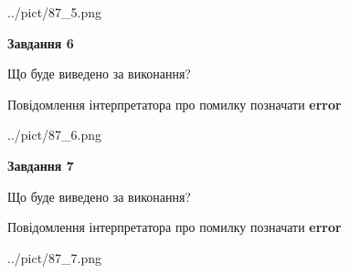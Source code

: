 \documentclass[10pt, ukrainian]{article}
\begin{document}
{\begin {large}
\begin{center}
	{../pict/87_5.png}
\end{center}
\newpage

{\begin {center}\textbf{Завдання 6}\end {center}}\par
Що буде виведено за виконання? \par
Повідомлення інтерпретатора про помилку позначати \textbf{error}

\begin{center}
	{../pict/87_6.png}
\end{center}
\newpage

{\begin {center}\textbf{Завдання 7}\end {center}}\par
Що буде виведено за виконання? \par
Повідомлення інтерпретатора про помилку позначати \textbf{error}

\begin{center}
	{../pict/87_7.png}
\end{center}
\newpage

\end {large}}
\end{document}
